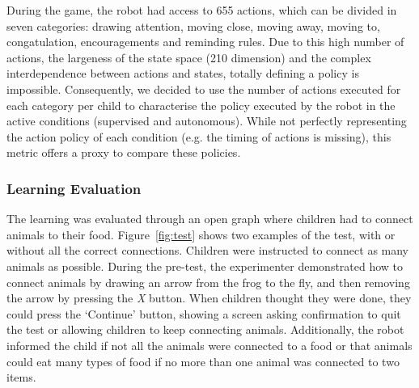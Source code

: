 During the game, the robot had access to 655 actions, which can be divided in seven categories: drawing attention, moving close, moving away, moving to, congatulation, encouragements and reminding rules. Due to this high number of actions, the largeness of the state space (210 dimension) and the complex interdependence between actions and states, totally defining a policy is impossible. Consequently, we decided to use the number of actions executed for each category per child to characterise the policy executed by the robot in the active conditions (supervised and autonomous). While not perfectly representing the action policy of each condition (e.g. the timing of actions is missing), this metric offers a proxy to compare these policies. 

\subsubsection{Learning Evaluation}
The learning was evaluated through an open graph where children had to connect animals to their food. Figure~\ref{fig:test} shows two examples of the test, with or without all the correct connections. Children were instructed to connect as many animals as possible. During the pre-test, the experimenter demonstrated how to connect animals by drawing an arrow from the frog to the fly, and then removing the arrow by pressing the \textit{X} button. When children thought they were done, they could press the `Continue' button, showing a screen asking confirmation to quit the test or allowing children to keep connecting animals. Additionally, the robot informed the child if not all the animals were connected to a food or that animals could eat many types of food if no more than one animal was connected to two items. 

